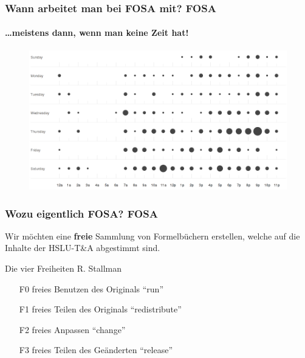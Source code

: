 \begin{frame}
	\frametitle{Wann arbeitet man bei FOSA mit? \hfill{} \footnotesize{FOSA}}
	\framesubtitle{\dots meistens dann, wenn man keine Zeit hat!}
	\begin{figure}
		\centering
		\includegraphics[width=1\textwidth]{fig/fosamath-punchcard.png}
	\end{figure}
\end{frame}

\begin{frame}
	\frametitle{Wozu eigentlich FOSA? \hfill{} \footnotesize{FOSA}}
	Wir möchten eine \textbf{freie} Sammlung von 
	Formelbüchern erstellen, welche auf die Inhalte der HSLU-T\&A
	abgestimmt sind.
	\vfill{}
	\begin{exampleblock}{Die vier Freiheiten 
		\hfill{} 
		\footnotesize{R. Stallman}}
		\begin{itemize}
			\item[F0] freies Benutzen des Originals 
				\hfill{} \footnotesize{"`run"'}
				\normalsize
			\item[F1] freies Teilen des Originals
				\hfill{} \footnotesize{"`redistribute"'}
				\normalsize
			\item[F2] freies Anpassen 
				\hfill{} \footnotesize{"`change"'}
				\normalsize
			\item[F3] freies Teilen des Geänderten 
				\hfill{} \footnotesize{"`release"'}
				\normalsize
		\end{itemize}
	\end{exampleblock}
\end{frame}

